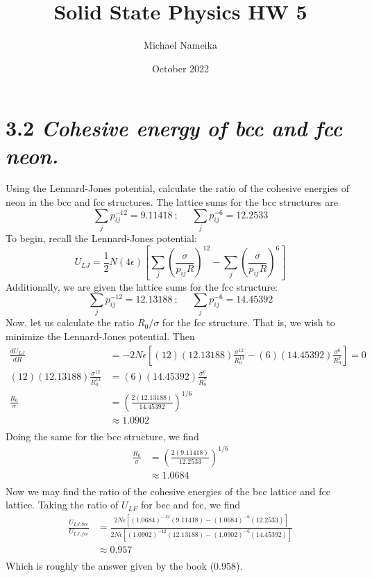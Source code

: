 \documentclass{article}
\title{Solid State Physics HW 5}
\author{Michael Nameika}
\date{October 2022}
\begin{document}
\maketitle

\section*{3.2 \textit{Cohesive energy of bcc and fcc neon.}}
Using the Lennard-Jones potential, calculate the ratio of the cohesive energies of neon in the bcc and fcc structures. The lattice sums for the bcc structures are
\[\sum_j p_{ij}^{-12} = 9.11418 \: ; \:\:\:\:\:\: \sum_j p_{ij}^{-6} = 12.2533\]
To begin, recall the Lennard-Jones potential:
\[U_{LJ} = \frac{1}{2}N(4\epsilon)\left[\sum_j \left(\frac{\sigma}{p_{ij}R}\right)^{12} - \sum_j \left(\frac{\sigma}{p_{ij}R}\right)^6\right]\]
Additionally, we are given the lattice sums for the fcc structure:
\[\sum_j p_{ij}^{-12} = 12.13188 \: ; \:\:\:\:\:\: \sum_j p_{ij}^{-6} = 14.45392\]
Now, let us calculate the ratio $R_0/\sigma$ for the fcc structure. That is, we wish to minimize the Lennard-Jones potential. Then
\begin{align*}
    \frac{dU_{LJ}}{dR} &= -2N\epsilon \left[(12)(12.13188)\frac{\sigma^{12}}{R_0^{13}} - (6)(14.45392)\frac{\sigma^6}{R_0^7}\right] = 0 \\
    (12)(12.13188) \frac{\sigma^{12}}{R_0^{13}} &= (6)(14.45392)\frac{\sigma^6}{R_0^7} \\
    \frac{R_0}{\sigma} &= \left(\frac{2(12.13188)}{14.45392}\right)^{1/6} \\
    &\approx 1.0902\\
\end{align*}
Doing the same for the bcc structure, we find
\begin{align*}
    \frac{R_0}{\sigma} &= \left(\frac{2(9.11418)}{12.2533}\right)^{1/6} \\
    &\approx 1.0684\\
\end{align*}
Now we may find the ratio of the cohesive energies of the bcc lattice and fcc lattice. Taking the ratio of $U_{LF}$ for bcc and fcc, we find
\begin{align*}
    \frac{U_{LJ,bcc}}{U_{LJ,fcc}} &= \frac{2N\epsilon\left[(1.0684)^{-12}(9.11418) -  (1.0684)^{-6}(12.2533)\right]}{2N\epsilon\left[(1.0902)^{-12}(12.1
    3188) - (1.0902)^{-6}(14.45392)\right]} \\
    &\approx 0.957 \\
\end{align*}
Which is roughly the answer given by the book (0.958). 
\end{document}
